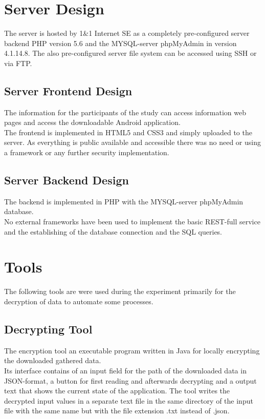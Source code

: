 \section{Server Design}
The server is hosted by 1\&1 Internet SE as a completely pre-configured server backend PHP version 5.6 and the MYSQL-server phpMyAdmin in version 4.1.14.8. The also pre-configured server file system can be accessed using SSH or via FTP.

\subsection{Server Frontend Design}
The information for the participants of the study can access information web pages and access the downloadable Android application.\\
The frontend is implemented in HTML5 and CSS3 and simply uploaded to the server. As everything is public available and accessible there was no need or using a framework or any further security implementation. 

\subsection{Server Backend Design}
The backend is implemented in PHP with the MYSQL-server phpMyAdmin database.\\ 
No external frameworks have been used to implement the basic REST-full service and the establishing of the database connection and the SQL queries. 

\section{Tools}
The following tools are were used during the experiment primarily for the decryption of data to automate some processes.

\subsection{Decrypting Tool}
The encryption tool an executable program written in Java for locally encrypting the downloaded gathered data.\\
Its interface contains of an input field for the path of the downloaded data in JSON-format, a button for first reading and afterwards decrypting and a output text that shows the current state of the application. The tool writes the decrypted input values in a separate text file in the same directory of the input file with the same name but with the file extension .txt instead of .json. 

